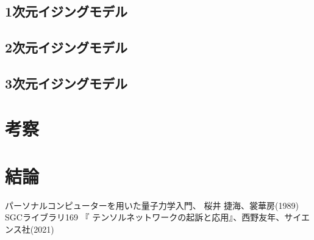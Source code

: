 \documentclass[dvipdfmx, titlepage]{jsarticle}   %
\begin{document}
\subsection{1次元イジングモデル}
\subsection{2次元イジングモデル}
\subsection{3次元イジングモデル}


\section{考察}

\section{結論}

\begin{thebibliography}{99}
   パーソナルコンピューターを用いた量子力学入門、 桜井 捷海、裳華房(1989)
  SGCライブラリ169 『 テンソルネットワークの起訴と応用』、西野友年、サイエンス社(2021)
\end{thebibliography}
\end{document}
